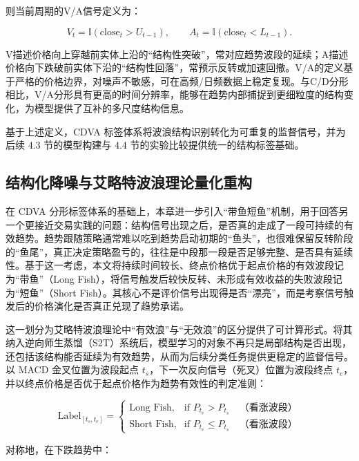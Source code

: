则当前周期的V/A信号定义为：

\begin{equation}
V_t = \mathbb{I}(\mathrm{close}_t > U_{t-1}),
\qquad
A_t = \mathbb{I}(\mathrm{close}_t < L_{t-1}).
\end{equation}

V描述价格向上穿越前实体上沿的``结构性突破''，常对应趋势波段的延续；A描述价格向下跌破前实体下沿的``结构性回落''，常预示反转或加速回撤。V/A的定义基于严格的价格边界，对噪声不敏感，可在高频/日频数据上稳定复现。与C/D分形相比，V/A分形具有更高的时间分辨率，能够在趋势内部捕捉到更细粒度的结构变化，为模型提供了互补的多尺度结构信息。

基于上述定义，CDVA 标签体系将波浪结构识别转化为可重复的监督信号，并为后续 4.3 节的模型构建与 4.4 节的实验比较提供统一的结构标签基础。

\subsection{结构化降噪与艾略特波浪理论量化重构}

在 CDVA 分形标签体系的基础上，本章进一步引入``带鱼短鱼''机制，用于回答另一个更接近交易实践的问题：结构信号出现之后，是否真的走成了一段可持续的有效趋势。趋势跟随策略通常难以吃到趋势启动初期的``鱼头''，也很难保留反转阶段的``鱼尾''，真正决定策略盈亏的，往往是中段那一段是否足够完整、是否具有延续性。基于这一考虑，本文将持续时间较长、终点价格优于起点价格的有效波段记为``带鱼''（Long Fish），将信号触发后较快反转、未形成有效收益的失败波段记为``短鱼''（Short Fish）。其核心不是评价信号出现得是否“漂亮”，而是考察信号触发后的价格演化是否真正兑现了趋势承诺。

这一划分为艾略特波浪理论中``有效浪''与``无效浪''的区分提供了可计算形式。将其纳入逆向师生蒸馏（S2T）系统后，模型学习的对象不再只是局部结构是否出现，还包括该结构能否延续为有效趋势，从而为后续分类任务提供更稳定的监督信号。以 MACD 金叉位置为波段起点 $t_s$，下一次反向信号（死叉）位置为波段终点 $t_e$，并以终点价格是否优于起点价格作为趋势有效性的判定准则：

\begin{equation}
\text{Label}_{[t_s, t_e]} =
\begin{cases}
\text{Long Fish}, & \text{if } P_{t_e} > P_{t_s} \quad \text{（看涨波段）} \\
\text{Short Fish}, & \text{if } P_{t_e} \leq P_{t_s} \quad \text{（看涨波段）}
\end{cases}
\end{equation}

对称地，在下跌趋势中：

